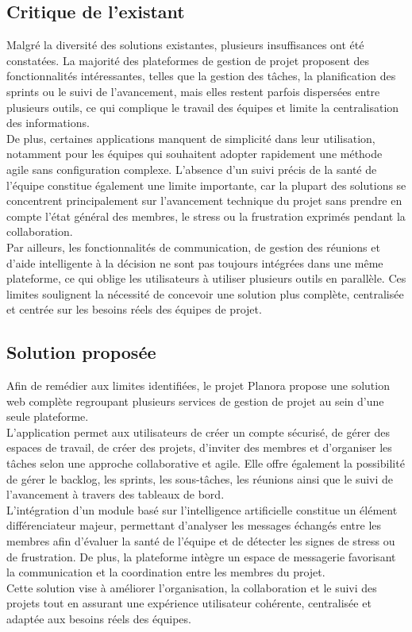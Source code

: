 \subsection{Critique de l'existant}
Malgré la diversité des solutions existantes, plusieurs insuffisances ont été constatées. La majorité des plateformes de gestion de projet proposent des fonctionnalités intéressantes, telles que la gestion des tâches, la planification des sprints ou le suivi de l'avancement, mais elles restent parfois dispersées entre plusieurs outils, ce qui complique le travail des équipes et limite la centralisation des informations.\\
De plus, certaines applications manquent de simplicité dans leur utilisation, notamment pour les équipes qui souhaitent adopter rapidement une méthode agile sans configuration complexe. L'absence d'un suivi précis de la santé de l'équipe constitue également une limite importante, car la plupart des solutions se concentrent principalement sur l'avancement technique du projet sans prendre en compte l'état général des membres, le stress ou la frustration exprimés pendant la collaboration.\\
Par ailleurs, les fonctionnalités de communication, de gestion des réunions et d'aide intelligente à la décision ne sont pas toujours intégrées dans une même plateforme, ce qui oblige les utilisateurs à utiliser plusieurs outils en parallèle. Ces limites soulignent la nécessité de concevoir une solution plus complète, centralisée et centrée sur les besoins réels des équipes de projet.

\subsection{Solution proposée}
Afin de remédier aux limites identifiées, le projet Planora propose une solution web complète regroupant plusieurs services de gestion de projet au sein d'une seule plateforme.\\
L'application permet aux utilisateurs de créer un compte sécurisé, de gérer des espaces de travail, de créer des projets, d'inviter des membres et d'organiser les tâches selon une approche collaborative et agile. Elle offre également la possibilité de gérer le backlog, les sprints, les sous-tâches, les réunions ainsi que le suivi de l'avancement à travers des tableaux de bord.\\
L'intégration d'un module basé sur l'intelligence artificielle constitue un élément différenciateur majeur, permettant d'analyser les messages échangés entre les membres afin d'évaluer la santé de l'équipe et de détecter les signes de stress ou de frustration. De plus, la plateforme intègre un espace de messagerie favorisant la communication et la coordination entre les membres du projet.\\
Cette solution vise à améliorer l'organisation, la collaboration et le suivi des projets tout en assurant une expérience utilisateur cohérente, centralisée et adaptée aux besoins réels des équipes.

